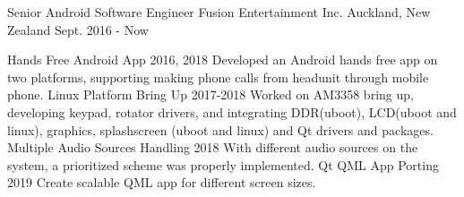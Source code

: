 

\begin{cventries}

\cventry
{Senior Android Software Engineer} %
{Fusion Entertainment Inc.} %
{Auckland, New Zealand} %
{Sept. 2016 - Now} %
{
  \begin{cvsubentries} %
    \cvsubentry
      {}
      {Hands Free Android App}
      {2016, 2018}
      {Developed an Android hands free app on two platforms, supporting making phone calls from headunit
      through mobile phone.}
    \cvsubentry
      {}
      {Linux Platform Bring Up}
      {2017-2018}
      {Worked on AM3358 bring up, developing keypad, rotator drivers, and integrating DDR(uboot), LCD(uboot and linux), graphics, splashscreen (uboot and linux) and Qt drivers and packages.}
    \cvsubentry
      {}
      {Multiple Audio Sources Handling}
      {2018}
      {With different audio sources on the system, a prioritized scheme was properly implemented.}
    \cvsubentry
      {}
      {Qt QML App Porting}
      {2019}
      {Create scalable QML app for different screen sizes.}
  \end{cvsubentries}
}


\end{cventries}
